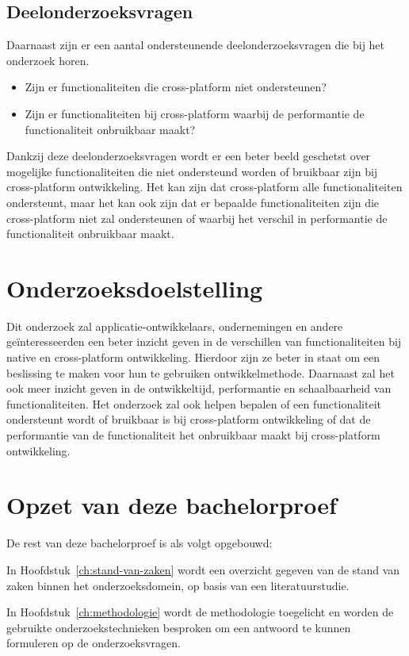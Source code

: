 \newpage
\subsection{Deelonderzoeksvragen}
Daarnaast zijn er een aantal ondersteunende deelonderzoeksvragen die bij het onderzoek horen.
\begin{itemize}
    \item Zijn er functionaliteiten die cross-platform niet ondersteunen?
    \item Zijn er functionaliteiten bij cross-platform waarbij de performantie de functionaliteit onbruikbaar maakt?
\end{itemize}
Dankzij deze deelonderzoeksvragen wordt er een beter beeld geschetst over mogelijke functionaliteiten die niet 
ondersteund worden of bruikbaar zijn bij cross-platform ontwikkeling. Het kan zijn dat cross-platform alle functionaliteiten ondersteunt,
maar het kan ook zijn dat er bepaalde functionaliteiten zijn die cross-platform niet zal ondersteunen of waarbij het verschil 
in performantie de functionaliteit onbruikbaar maakt.


\section{Onderzoeksdoelstelling}%
\label{sec:onderzoeksdoelstelling}
Dit onderzoek zal applicatie-ontwikkelaars, ondernemingen en andere geïnteresseerden een beter inzicht geven in de verschillen van functionaliteiten 
bij native en cross-platform ontwikkeling. Hierdoor zijn ze beter in staat om een beslissing te maken voor hun te gebruiken ontwikkelmethode. 
Daarnaast zal het ook meer inzicht geven in de ontwikkeltijd, performantie en schaalbaarheid van functionaliteiten. 
Het onderzoek zal ook helpen bepalen of een functionaliteit ondersteunt wordt of bruikbaar is bij cross-platform ontwikkeling of dat de 
performantie van de functionaliteit het onbruikbaar maakt bij cross-platform ontwikkeling. 

\section{Opzet van deze bachelorproef}%
\label{sec:opzet-bachelorproef}
De rest van deze bachelorproef is als volgt opgebouwd:

In Hoofdstuk~\ref{ch:stand-van-zaken} wordt een overzicht gegeven van de stand van zaken binnen 
het onderzoeksdomein, op basis van een literatuurstudie.

In Hoofdstuk~\ref{ch:methodologie} wordt de methodologie toegelicht en worden de gebruikte onderzoekstechnieken 
besproken om een antwoord te kunnen formuleren op de onderzoeksvragen.

